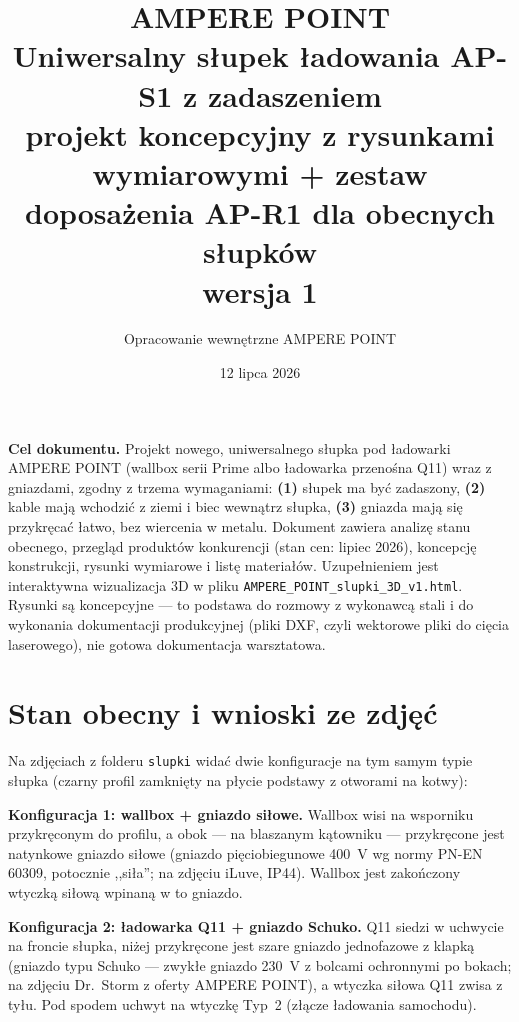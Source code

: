 \documentclass[11pt,a4paper]{article}
\title{\textbf{\color{apnavy}AMPERE POINT}\\[4pt]
\large Uniwersalny słupek ładowania AP-S1 z zadaszeniem\\[2pt]
\normalsize projekt koncepcyjny z rysunkami wymiarowymi + zestaw doposażenia AP-R1 dla obecnych słupków\\
wersja 1}
\author{Opracowanie wewnętrzne AMPERE POINT}
\date{12 lipca 2026}
\begin{document}
\maketitle
\vspace{-1.4em}

\noindent\textbf{Cel dokumentu.} Projekt nowego, uniwersalnego słupka pod ładowarki AMPERE POINT
(wallbox serii Prime albo ładowarka przenośna Q11) wraz z gniazdami, zgodny z trzema wymaganiami:
\textbf{(1)} słupek ma być zadaszony, \textbf{(2)} kable mają wchodzić z ziemi i biec wewnątrz słupka,
\textbf{(3)} gniazda mają się przykręcać łatwo, bez wiercenia w metalu. Dokument zawiera analizę
stanu obecnego, przegląd produktów konkurencji (stan cen: lipiec 2026), koncepcję konstrukcji,
rysunki wymiarowe i listę materiałów. Uzupełnieniem jest interaktywna wizualizacja 3D w pliku
\texttt{AMPERE\_POINT\_slupki\_3D\_v1.html}. Rysunki są koncepcyjne --- to podstawa do rozmowy
z wykonawcą stali i do wykonania dokumentacji produkcyjnej (pliki DXF, czyli wektorowe pliki
do cięcia laserowego), nie gotowa dokumentacja warsztatowa.

\tableofcontents

\section{Stan obecny i wnioski ze zdjęć}
Na zdjęciach z folderu \texttt{slupki} widać dwie konfiguracje na tym samym typie słupka
(czarny profil zamknięty na płycie podstawy z otworami na kotwy):

\textbf{Konfiguracja 1: wallbox + gniazdo siłowe.} Wallbox wisi na wsporniku przykręconym do
profilu, a obok --- na blaszanym kątowniku --- przykręcone jest natynkowe gniazdo siłowe
(gniazdo pięciobiegunowe 400~V wg normy PN-EN 60309, potocznie ,,siła''; na zdjęciu iLuve, IP44).
Wallbox jest zakończony wtyczką siłową wpinaną w to gniazdo.

\textbf{Konfiguracja 2: ładowarka Q11 + gniazdo Schuko.} Q11 siedzi w uchwycie na froncie słupka,
niżej przykręcone jest szare gniazdo jednofazowe z klapką (gniazdo typu Schuko --- zwykłe gniazdo
230~V z bolcami ochronnymi po bokach; na zdjęciu Dr.~Storm z oferty AMPERE POINT), a wtyczka
siłowa Q11 zwisa z tyłu. Pod spodem uchwyt na wtyczkę Typ~2 (złącze ładowania samochodu).
\end{document}
